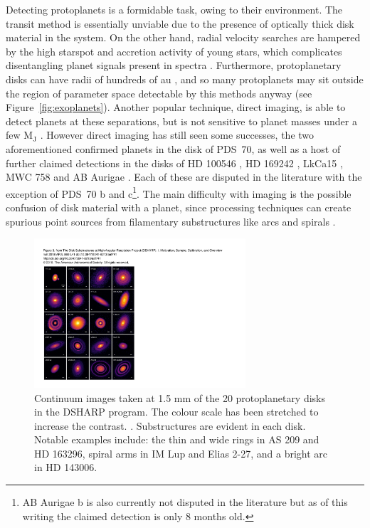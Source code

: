 Detecting protoplanets is a formidable task, owing to their environment.
The transit method is essentially unviable due to the presence of optically thick disk material in the system.
On the other hand, radial velocity searches are hampered by the high starspot and accretion activity of young stars, which complicates disentangling planet signals present in spectra \citep{desort2007}.
Furthermore, protoplanetary disks can have radii of hundreds of au \citep[e.g.][]{tripathi2017}, and so many protoplanets may sit outside the region of parameter space detectable by this methods anyway (see Figure~\ref{fig:exoplanets}).
Another popular technique, direct imaging, is able to detect planets at these separations, but is not sensitive to planet masses under a few $\mathrm{M_J}$ \citep{jorquera2021}.
However direct imaging has still seen some successes, the two aforementioned confirmed planets in the disk of PDS~70, as well as a host of further claimed detections in the disks of HD 100546 \citep{quanz2013}, HD 169242 \citep{biller2014}, LkCa15 \citep{sallum2015}, MWC 758 \citep{reggiani2018} and AB Aurigae \citep{currie2022}. Each of these are disputed in the literature \citep{rameau2017,ligi2018,currie2019} with the exception of PDS~70 b and c\footnote{AB Aurigae b is also currently not disputed in the literature but as of this writing the claimed detection is only 8 months old.}.
The main difficulty with imaging is the possible confusion of disk material with a planet, since processing techniques can create spurious point sources from filamentary substructures like arcs and spirals \citep[eg.][]{rameau2017}.

\begin{figure}
    \centering
    \includegraphics[width = 0.7\textwidth]{figures/DSHARP.pdf}
    \caption{Continuum images taken at 1.5 mm of the 20 protoplanetary disks in the DSHARP program. The colour scale has been stretched to increase the contrast. \citep{andrews2018}. Substructures are evident in each disk. Notable examples include: the thin and wide rings in AS 209 and HD 163296, spiral arms in IM Lup and Elias 2-27, and a bright arc in HD 143006.}
    \label{fig:DSHARP}
\end{figure}

